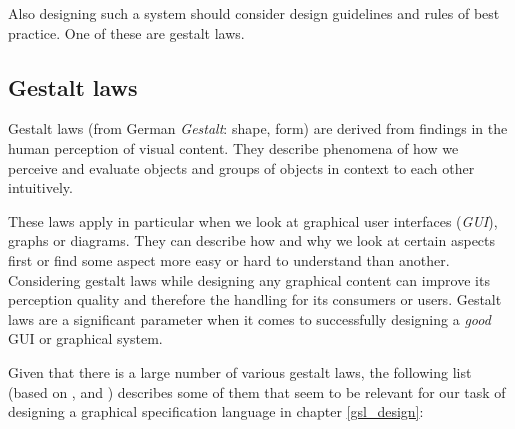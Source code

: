 \documentclass[twoside, openright, 12pt]{book}
\begin{document}
Also designing such a system should consider design guidelines and rules of best practice.
One of these are gestalt laws.

\subsection{Gestalt laws}
\label{gestalt_laws}
Gestalt laws (from German \textit{Gestalt}: shape, form) are derived from findings in the human perception of visual content.
They describe phenomena of how we perceive and evaluate objects and groups of objects in context to each other intuitively.

These laws apply in particular when we look at graphical user interfaces (\textit{GUI}), graphs or diagrams.
They can describe how and why we look at certain aspects first or find some aspect more easy or hard to understand than another.
Considering gestalt laws while designing any graphical content can improve its perception quality and therefore the handling for its consumers or users.
Gestalt laws are a significant parameter when it comes to successfully designing a \textit{good} GUI or graphical system.

Given that there is a large number of various gestalt laws, the following list (based on \citep{Goeckel01a}, \citep{Heinecke04a} and \citep{Sternberg}) describes some of them that seem to be relevant for our task of designing a graphical specification language in chapter \ref{gsl_design}:
\end{document}
